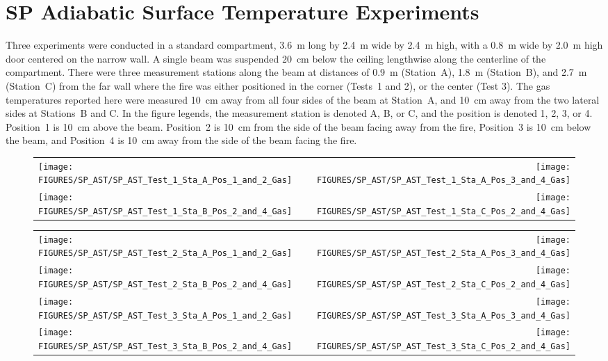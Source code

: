 \clearpage

\section{SP Adiabatic Surface Temperature Experiments}

Three experiments were conducted in a standard compartment, 3.6~m long by 2.4~m wide by 2.4~m high, with a 0.8~m wide by 2.0~m high door centered on the narrow wall. A single beam was suspended 20~cm below the ceiling lengthwise along the centerline of the compartment. There were three measurement stations along the beam at distances of 0.9~m (Station~A), 1.8~m (Station~B), and 2.7~m (Station~C) from the far wall where the fire was either positioned in the corner (Tests~1 and 2), or the center (Test 3). The gas temperatures reported here were measured 10~cm away from all four sides of the beam at Station~A, and 10~cm away from the two lateral sides at Stations~B and C. In the figure legends, the measurement station is denoted A, B, or C, and the position is denoted 1, 2, 3, or 4. Position~1 is 10~cm above the beam. Position~2 is 10~cm from the side of the beam facing away from the fire, Position~3 is 10~cm below the beam, and Position~4 is 10~cm away from the side of the beam facing the fire.

\begin{figure}[h!]
\begin{tabular*}{\textwidth}{l@{\extracolsep{\fill}}r}
\texttt{[image: FIGURES/SP\_AST/SP\_AST\_Test\_1\_Sta\_A\_Pos\_1\_and\_2\_Gas]} &
\texttt{[image: FIGURES/SP\_AST/SP\_AST\_Test\_1\_Sta\_A\_Pos\_3\_and\_4\_Gas]} \\
\texttt{[image: FIGURES/SP\_AST/SP\_AST\_Test\_1\_Sta\_B\_Pos\_2\_and\_4\_Gas]} &
\texttt{[image: FIGURES/SP\_AST/SP\_AST\_Test\_1\_Sta\_C\_Pos\_2\_and\_4\_Gas]}
\end{tabular*}
\label{SP_Test_1_Gas}
\end{figure}

\newpage

\begin{figure}[p]
\begin{tabular*}{\textwidth}{l@{\extracolsep{\fill}}r}
\texttt{[image: FIGURES/SP\_AST/SP\_AST\_Test\_2\_Sta\_A\_Pos\_1\_and\_2\_Gas]} &
\texttt{[image: FIGURES/SP\_AST/SP\_AST\_Test\_2\_Sta\_A\_Pos\_3\_and\_4\_Gas]} \\
\texttt{[image: FIGURES/SP\_AST/SP\_AST\_Test\_2\_Sta\_B\_Pos\_2\_and\_4\_Gas]} &
\texttt{[image: FIGURES/SP\_AST/SP\_AST\_Test\_2\_Sta\_C\_Pos\_2\_and\_4\_Gas]} \\
\texttt{[image: FIGURES/SP\_AST/SP\_AST\_Test\_3\_Sta\_A\_Pos\_1\_and\_2\_Gas]} &
\texttt{[image: FIGURES/SP\_AST/SP\_AST\_Test\_3\_Sta\_A\_Pos\_3\_and\_4\_Gas]} \\
\texttt{[image: FIGURES/SP\_AST/SP\_AST\_Test\_3\_Sta\_B\_Pos\_2\_and\_4\_Gas]} &
\texttt{[image: FIGURES/SP\_AST/SP\_AST\_Test\_3\_Sta\_C\_Pos\_2\_and\_4\_Gas]}
\end{tabular*}
\label{SP_Test_2_3_Gas}
\end{figure}

